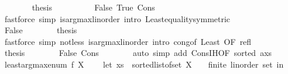\begin{isabellebody}
\ \ \ \ \ \ \isamarkupfalse%
\ {\isacharquery}{\kern0pt}thesis\isanewline
\ \ \ \ \ \ \ \ \isamarkupfalse%
\ False\ True\ Cons\isanewline
\ \ \ \ \ \ \ \ \isamarkupfalse%
\ {\isacharparenleft}{\kern0pt}fastforce\ simp{\isacharcolon}{\kern0pt}\ is{\isacharunderscore}{\kern0pt}arg{\isacharunderscore}{\kern0pt}max{\isacharunderscore}{\kern0pt}linorder\ intro{\isacharbang}{\kern0pt}{\isacharcolon}{\kern0pt}\ Least{\isacharunderscore}{\kern0pt}equality{\isacharbrackleft}{\kern0pt}symmetric{\isacharbrackright}{\kern0pt}{\isacharparenright}{\kern0pt}\isanewline
\ \ \ \ \isamarkupfalse%
\isanewline
\ \ \ \ \ \ \isamarkupfalse%
\ False\isanewline
\ \ \ \ \ \ \isamarkupfalse%
\ {\isacharquery}{\kern0pt}thesis\isanewline
\ \ \ \ \ \ \ \ \isamarkupfalse%
\ {\isacharparenleft}{\kern0pt}fastforce\ simp{\isacharcolon}{\kern0pt}\ not{\isacharunderscore}{\kern0pt}less\ is{\isacharunderscore}{\kern0pt}arg{\isacharunderscore}{\kern0pt}max{\isacharunderscore}{\kern0pt}linorder\ intro{\isacharbang}{\kern0pt}{\isacharcolon}{\kern0pt}\ cong{\isacharbrackleft}{\kern0pt}of\ Least{\isacharcomma}{\kern0pt}\ OF\ refl{\isacharbrackright}{\kern0pt}{\isacharparenright}{\kern0pt}\isanewline
\ \ \ \ \isamarkupfalse%
\isanewline
\ \ \ \ \isamarkupfalse%
\ {\isacharquery}{\kern0pt}thesis\isanewline
\ \ \ \ \ \ \isamarkupfalse%
\ False\ Cons\isanewline
\ \ \ \ \ \ \isamarkupfalse%
\ {\isacharparenleft}{\kern0pt}auto\ simp\ add{\isacharcolon}{\kern0pt}\ Cons{\isachardot}{\kern0pt}IH{\isacharbrackleft}{\kern0pt}OF\ {\isacartoucheopen}sorted\ {\isacharparenleft}{\kern0pt}a{\isacharhash}{\kern0pt}xs{\isacharparenright}{\kern0pt}{\isacartoucheclose}{\isacharbrackright}{\kern0pt}{\isacharparenright}{\kern0pt}\isanewline
\ \ \isamarkupfalse%
\isanewline
{}\isamarkupfalse%
%
\endisatagproof
{\isafoldproof}%
%
\isadelimproof
\isanewline
%
\endisadelimproof
\isanewline
{}\isamarkupfalse%
\ {\isachardoublequoteopen}least{\isacharunderscore}{\kern0pt}arg{\isacharunderscore}{\kern0pt}max{\isacharunderscore}{\kern0pt}enum\ f\ X\ {\isacharequal}{\kern0pt}\ {\isacharparenleft}{\kern0pt}\isanewline
\ \ let\ xs\ {\isacharequal}{\kern0pt}\ sorted{\isacharunderscore}{\kern0pt}list{\isacharunderscore}{\kern0pt}of{\isacharunderscore}{\kern0pt}set\ {\isacharparenleft}{\kern0pt}X\ {\isacharcolon}{\kern0pt}{\isacharcolon}{\kern0pt}\ {\isacharparenleft}{\kern0pt}{\isacharunderscore}{\kern0pt}\ {\isacharcolon}{\kern0pt}{\isacharcolon}{\kern0pt}\ {\isacharbraceleft}{\kern0pt}finite{\isacharcomma}{\kern0pt}\ linorder{\isacharbraceright}{\kern0pt}{\isacharparenright}{\kern0pt}\ set{\isacharparenright}{\kern0pt}\ in\isanewline

\end{isabellebody}
